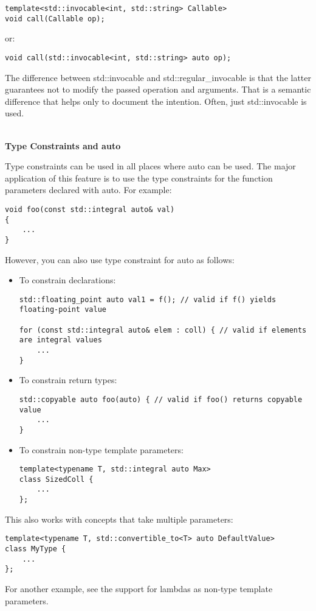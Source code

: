 \begin{lstlisting}[style=styleCXX]
template<std::invocable<int, std::string> Callable>
void call(Callable op);
\end{lstlisting}

or:

\begin{lstlisting}[style=styleCXX]
void call(std::invocable<int, std::string> auto op);
\end{lstlisting}

The difference between std::invocable and std::regular\_invocable is that the latter guarantees not to modify the passed operation and arguments. That is a semantic difference that helps only to document the intention. Often, just std::invocable is used.

\noindent
\hspace*{\fill} \\ %
\textbf{Type Constraints and auto}

Type constraints can be used in all places where auto can be used. The major application of this feature is to use the type constraints for the function parameters declared with auto. For example:

\begin{lstlisting}[style=styleCXX]
void foo(const std::integral auto& val)
{
	...
}
\end{lstlisting}

However, you can also use type constraint for auto as follows:

\begin{itemize}
\item
To constrain declarations:

\begin{lstlisting}[style=styleCXX]
std::floating_point auto val1 = f(); // valid if f() yields floating-point value

for (const std::integral auto& elem : coll) { // valid if elements are integral values
	...
}
\end{lstlisting}

\item
To constrain return types:

\begin{lstlisting}[style=styleCXX]
std::copyable auto foo(auto) { // valid if foo() returns copyable value
	...
}
\end{lstlisting}

\item
To constrain non-type template parameters:

\begin{lstlisting}[style=styleCXX]
template<typename T, std::integral auto Max>
class SizedColl {
	...
};
\end{lstlisting}
\end{itemize}

This also works with concepts that take multiple parameters:

\begin{lstlisting}[style=styleCXX]
template<typename T, std::convertible_to<T> auto DefaultValue>
class MyType {
	...
};
\end{lstlisting}

For another example, see the support for lambdas as non-type template parameters.












